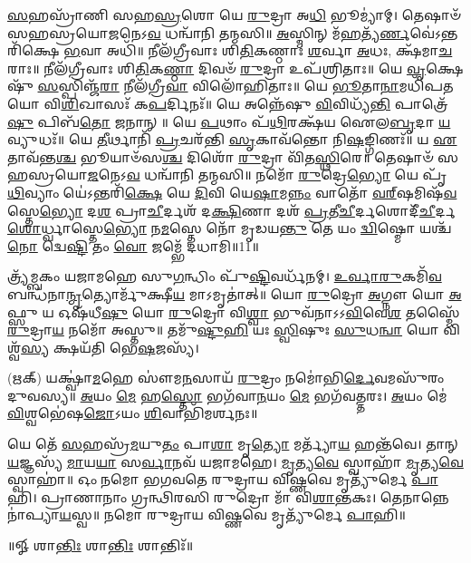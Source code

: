 \-\ul{𑌸}\-𑌹𑌸𑍍𑌰𑌾᳴𑌣𑌿 𑌸𑌹\-\ul{𑌸𑍍𑌰}\-𑌶𑍋 𑌯𑍇 \ul{𑌰𑍁}\-𑌦𑍍𑌰𑌾 𑌅\-\ul{𑌧𑌿} 𑌭𑍂𑌮𑍍𑌯𑌾॑𑌮𑍍। 𑌤𑍇𑌷𑌾𑍞᳴ 𑌸𑌹𑌸𑍍𑌰𑌯𑍋\-\ul{𑌜}\-𑌨𑍇𑌽\-\ul{𑌵} 𑌧𑌨𑍍𑌵𑌾᳴𑌨𑌿 𑌤𑌨𑍍𑌮𑌸𑌿॥ \ul{𑌅}\-𑌸𑍍𑌮𑌿𑌨𑍍 𑌮᳴\-\ul{𑌹}\-𑌤𑍍𑌯᳴\-\ul{𑌰𑍍𑌣}\-𑌵𑍇॑\-𑌽𑌨𑍍𑌤𑌰𑌿᳴𑌕𑍍𑌷𑍇 \ul{𑌭}\-𑌵𑌾 𑌅𑌧𑌿᳴॥ 𑌨𑍀𑌲᳴𑌗𑍍𑌰𑍀𑌵𑌾𑌃 𑌶𑌿\-\ul{𑌤𑌿}\-𑌕𑌣𑍍𑌠𑌾𑌃॑ \ul{𑌶}\-𑌰𑍍𑌵𑌾 \ul{𑌅}\-𑌧𑌃, 𑌕𑍍𑌷᳴𑌮𑌾\-\ul{𑌚}\-𑌰𑌾𑌃॥ 𑌨𑍀𑌲᳴𑌗𑍍𑌰𑍀𑌵𑌾𑌃 𑌶𑌿\-\ul{𑌤𑌿}\-𑌕\-\ul{𑌣𑍍𑌠𑌾} 𑌦𑌿𑌵𑍞᳴ \ul{𑌰𑍁}\-𑌦𑍍𑌰𑌾 𑌉𑌪᳴𑌶𑍍𑌰𑌿𑌤𑌾𑌃॥ 𑌯𑍇 \ul{𑌵𑍃}\-𑌕𑍍𑌷𑍇𑌷𑍁᳴ \ul{𑌸}\-𑌸𑍍𑌪𑌿𑌞𑍍𑌜᳴\-\ul{𑌰𑌾} 𑌨𑍀𑌲᳴𑌗𑍍𑌰𑍀\-\ul{𑌵𑌾} 𑌵𑌿𑌲𑍋᳴𑌹𑌿𑌤𑌾𑌃॥ 𑌯𑍇 \ul{𑌭𑍂}\-𑌤𑌾\-\ul{𑌨𑌾}\-𑌮𑌧𑌿᳴𑌪𑌤𑌯𑍋 𑌵𑌿\-\ul{𑌶𑌿}\-𑌖𑌾𑌸𑌃᳴ 𑌕\-\ul{𑌪}\-𑌰𑍍𑌦𑌿𑌨𑌃᳴॥ 𑌯𑍇 𑌅𑌨𑍍𑌨𑍇᳴𑌷𑍁 \ul{𑌵𑌿}\-𑌵𑌿𑌧𑍍𑌯᳴\-\ul{𑌨𑍍𑌤𑌿} 𑌪𑌾𑌤𑍍𑌰𑍇᳴\-\ul{𑌷𑍁} 𑌪𑌿𑌬᳴\-\ul{𑌤𑍋} 𑌜𑌨𑌾𑌨𑍍॥ 𑌯𑍇 \ul{𑌪}\-𑌥𑌾𑌂 𑌪᳴\-\ul{𑌥𑌿}\-𑌰𑌕𑍍𑌷᳴𑌯 𑌐𑌲\-\ul{𑌬𑍃}\-𑌦𑌾 \ul{𑌯}\-𑌵𑍍𑌯𑍁𑌧𑌃᳴॥ 𑌯𑍇 \ul{𑌤𑍀}\-𑌰𑍍𑌥𑌾𑌨𑌿᳴ \ul{𑌪𑍍𑌰}\-𑌚𑌰᳴𑌨𑍍𑌤𑌿 \ul{𑌸𑍃}\-𑌕𑌾𑌵᳴𑌨𑍍𑌤𑍋 𑌨𑌿\-\ul{𑌷}\-𑌙𑍍𑌗𑌿𑌣𑌃᳴॥ 𑌯 \ul{𑌏}\-𑌤𑌾𑌵᳴𑌨𑍍𑌤\-\ul{𑌶𑍍𑌚} 𑌭𑍂𑌯𑌾𑍞᳴𑌸\-\ul{𑌶𑍍𑌚} 𑌦𑌿𑌶𑍋᳴ \ul{𑌰𑍁}\-𑌦𑍍𑌰𑌾 𑌵𑌿᳴𑌤\-\ul{𑌸𑍍𑌥𑌿}\-𑌰𑍇॥ 𑌤𑍇𑌷𑌾𑍞᳴ 𑌸𑌹𑌸𑍍𑌰𑌯𑍋\-\ul{𑌜}\-𑌨𑍇𑌽\-\ul{𑌵} 𑌧𑌨𑍍𑌵𑌾᳴𑌨𑌿 𑌤𑌨𑍍𑌮𑌸𑌿॥ 𑌨𑌮𑍋᳴ \ul{𑌰𑍁}\-𑌦𑍍𑌰𑍇\-\ul{𑌭𑍍𑌯𑍋} 𑌯𑍇 𑌪𑍃᳴\-\ul{𑌥𑌿}\-𑌵𑍍𑌯𑌾𑌂 𑌯𑍇॑𑌽𑌨𑍍𑌤𑌰𑌿᳴\-\ul{𑌕𑍍𑌷𑍇} 𑌯𑍇 \ul{𑌦𑌿}\-𑌵𑌿 𑌯𑍇\-\ul{𑌷𑌾}\-𑌮\-\ul{𑌨𑍍𑌨𑌂} 𑌵𑌾𑌤𑍋᳴ \ul{𑌵}\-\ul{𑌰𑍍}‌𑌷𑌮𑌿𑌷᳴\-\ul{𑌵}\-𑌸𑍍𑌤𑍇\-\ul{𑌭𑍍𑌯𑍋} 𑌦\-\ul{𑌶} 𑌪𑍍𑌰𑌾\-\ul{𑌚𑍀}\-𑌰𑍍𑌦𑌶᳴ 𑌦\-\ul{𑌕𑍍𑌷𑌿}\-𑌣𑌾 𑌦𑌶᳴ \ul{𑌪𑍍𑌰}\-𑌤𑍀\-\ul{𑌚𑍀}\-𑌰𑍍𑌦𑌶𑍋\-𑌦𑍀᳴\-\ul{𑌚𑍀}\-𑌰𑍍𑌦\-\ul{𑌶𑍋}\-𑌰𑍍𑌧𑍍𑌵𑌾𑌸𑍍𑌤𑍇\-\ul{𑌭𑍍𑌯𑍋} 𑌨\-\ul{𑌮}\-𑌸𑍍𑌤𑍇 𑌨𑍋᳴ 𑌮𑍃𑌡𑌯\-\ul{𑌨𑍍𑌤𑍁} 𑌤𑍇 𑌯𑌂 \ul{𑌦𑍍𑌵𑌿}\-𑌷𑍍𑌮𑍋 𑌯𑌶𑍍𑌚᳴ \ul{𑌨𑍋} 𑌦𑍍𑌵𑍇\-\ul{𑌷𑍍𑌟𑌿} 𑌤𑌂 \ul{𑌵𑍋} 𑌜𑌮𑍍𑌭𑍇᳴ 𑌦𑌧𑌾𑌮𑌿॥11॥ 

𑌤𑍍𑌰𑍍𑌯᳴𑌮𑍍𑌬𑌕𑌂 𑌯𑌜𑌾𑌮𑌹𑍇 𑌸𑍁\-\ul{𑌗}\-𑌨𑍍𑌧𑌿𑌂 𑌪𑍁᳴\-\ul{𑌷𑍍𑌟𑌿}\-𑌵𑌰𑍍𑌧᳴𑌨𑌮𑍍। \ul{𑌉}\-\-\ul{𑌰𑍍𑌵𑌾}\-\-\ul{𑌰𑍁}\-𑌕𑌮𑌿᳴\-\ul{𑌵} 𑌬𑌨𑍍𑌧᳴𑌨𑌾\-\ul{𑌨𑍍𑌮𑍃}\-𑌤𑍍𑌯𑍋𑌰𑍍𑌮𑍁᳴𑌕𑍍𑌷𑍀\-\ul{𑌯} 𑌮𑌾𑌽𑌮𑍃𑌤𑌾॑𑌤𑍍॥ 𑌯𑍋 \ul{𑌰𑍁}\-𑌦𑍍𑌰𑍋 \ul{𑌅}\-𑌗𑍍𑌨𑍗 𑌯𑍋 \ul{𑌅}\-𑌫𑍍𑌸𑍁 𑌯 𑌓𑌷᳴𑌧𑍀\-\ul{𑌷𑍁} 𑌯𑍋 \ul{𑌰𑍁}\-𑌦𑍍𑌰𑍋 𑌵𑌿\-\ul{𑌶𑍍𑌵𑌾} 𑌭𑍁𑌵᳴𑌨𑌾𑌽𑌽\-\ul{𑌵𑌿}\-𑌵𑍇\-\ul{𑌶} 𑌤𑌸𑍍𑌮𑍈᳴ \ul{𑌰𑍁}\-𑌦𑍍𑌰𑌾\-\ul{𑌯} 𑌨𑌮𑍋᳴ 𑌅𑌸𑍍𑌤𑍁॥ 𑌤𑌮𑍁᳴\-\ul{𑌷𑍍𑌟𑍁}\-\-\ul{𑌹𑌿} 𑌯𑌃 \ul{𑌸𑍍𑌵𑌿}\-𑌷𑍁𑌃 \ul{𑌸𑍁}\-𑌧\-\ul{𑌨𑍍𑌵𑌾} 𑌯𑍋 𑌵𑌿𑌶𑍍𑌵᳴\-\ul{𑌸𑍍𑌯} 𑌕𑍍𑌷𑌯᳴𑌤𑌿 𑌭𑍇\-\ul{𑌷}\-𑌜𑌸𑍍𑌯᳴। 

(𑌋𑌕𑍍)   𑌯𑌕𑍍𑌷𑍍𑌵𑌾॑\-\ul{𑌮}\-𑌹𑍇 𑌸𑍗॑𑌮\-\ul{𑌨}\-𑌸𑌾𑌯᳴ \ul{𑌰𑍁}\-𑌦𑍍𑌰𑌂 𑌨𑌮𑍋॑𑌭𑌿\-\ul{𑌰𑍍𑌦𑍇}\-𑌵𑌮𑌸𑍁᳴𑌰𑌂 𑌦𑍁𑌵𑌸𑍍𑌯॥ \ul{𑌅}\-𑌯𑌂 \ul{𑌮𑍇} 𑌹\-\ul{𑌸𑍍𑌤𑍋} 𑌭𑌗᳴𑌵𑌾\-\ul{𑌨}\-𑌯𑌂 \ul{𑌮𑍇} 𑌭𑌗᳴𑌵𑌤𑍍𑌤𑌰𑌃। \ul{𑌅}\-𑌯𑌂 𑌮𑍇॑ \ul{𑌵𑌿}\-𑌶𑍍𑌵𑌭𑍇॑𑌷\-\ul{𑌜𑍋}\-𑌽𑌯𑌂 \ul{𑌶𑌿}\-𑌵𑌾𑌭𑌿᳴𑌮𑌰𑍍𑌶𑌨𑌃॥

𑌯𑍇 𑌤𑍇᳴ \ul{𑌸}\-𑌹𑌸𑍍𑌰᳴\-\ul{𑌮}\-𑌯𑍁\-\ul{𑌤𑌂} 𑌪𑌾\-\ul{𑌶𑌾} 𑌮𑍃\-\ul{𑌤𑍍𑌯𑍋} 𑌮𑌰𑍍𑌤𑍍𑌯𑌾᳴\-\ul{𑌯} 𑌹𑌨𑍍𑌤᳴𑌵𑍇। 𑌤𑌾𑌨𑍍 \ul{𑌯}\-𑌜𑍍𑌞𑌸𑍍𑌯᳴ \ul{𑌮𑌾}\-𑌯\-\ul{𑌯𑌾} 𑌸\-\ul{𑌰𑍍𑌵𑌾}\-𑌨𑌵᳴ 𑌯𑌜𑌾𑌮𑌹𑍇। \ul{𑌮𑍃}\-𑌤𑍍𑌯\-\ul{𑌵𑍇} 𑌸𑍍𑌵𑌾𑌹𑌾᳴ \ul{𑌮𑍃}\-𑌤𑍍𑌯\-\ul{𑌵𑍇} 𑌸𑍍𑌵𑌾𑌹𑌾॑॥ 𑌓𑌂 𑌨𑌮𑍋 𑌭𑌗𑌵𑌤𑍇 𑌰𑍁𑌦𑍍𑌰𑌾𑌯 𑌵𑌿𑌷𑍍𑌣𑌵𑍇 𑌮𑍃𑌤𑍍𑌯𑍁᳴𑌰𑍍𑌮𑍇 \ul{𑌪𑌾}\-𑌹𑌿। 𑌪𑍍𑌰𑌾𑌣𑌾𑌨𑌾𑌂 𑌗𑍍𑌰𑌨𑍍𑌥𑌿𑌰𑌸𑌿 𑌰𑍁𑌦𑍍𑌰𑍋 𑌮𑌾᳴ 𑌵𑌿\-\ul{𑌶𑌾}\-𑌨𑍍𑌤𑌕𑌃। 𑌤𑍇𑌨𑌾𑌨𑍍𑌨𑍇𑌨𑌾॑𑌪𑍍𑌯𑌾\-\ul{𑌯}\-𑌸𑍍𑌵॥ 𑌨𑌮𑍋 𑌰𑍁𑌦𑍍𑌰𑌾𑌯 𑌵𑌿𑌷𑍍𑌣𑌵𑍇 𑌮𑍃𑌤𑍍𑌯𑍁᳴𑌰𑍍𑌮𑍇 \ul{𑌪𑌾}\-𑌹𑌿॥
 
\centerline{॥𑍐 𑌶𑌾\-\ul{𑌨𑍍𑌤𑌿𑌃} 𑌶𑌾\-\ul{𑌨𑍍𑌤𑌿𑌃} 𑌶𑌾𑌨𑍍𑌤𑌿𑌃᳴॥}


